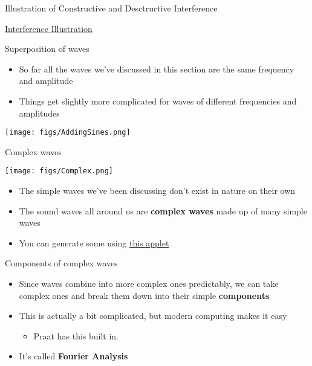 \documentclass[professionalfonts]{beamer}
\begin{document}
\begin{frame}{Illustration of Constructive and Desctructive Interference}
    \begin{center}
        \href{https://www.acs.psu.edu/drussell/Demos/superposition/interference.gif}{Interference Illustration}
    \end{center}
\end{frame}

\begin{frame}{Superposition of waves}
    \begin{multicols}{2}
        \begin{itemize}
            \item So far all the waves we’ve discussed in this section are the same frequency and amplitude
            \item Things get slightly more complicated for waves of different frequencies and amplitudes
        \end{itemize}
        \columnbreak
        \texttt{[image: figs/AddingSines.png]}
    \end{multicols}
\end{frame}

\begin{frame}{Complex waves}
    \begin{multicols}{2}
        \texttt{[image: figs/Complex.png]}

        \columnbreak

        \begin{itemize}
            \item The simple waves we’ve been discussing don’t exist in nature on their own
            \item The sound waves all around us are \textbf{complex waves} made up of many simple waves
            \item You can generate some using \href{https://www.falstad.com/fourier/}{this applet}
        \end{itemize}
    \end{multicols}
\end{frame}

\begin{frame}{Components of complex waves}
    \begin{itemize}
        \item Since waves combine into more complex ones predictably, we can take complex ones and break them down into their simple \textbf{components}
        \item This is actually a bit complicated, but modern computing makes it easy
        \begin{itemize}
            \item Praat has this built in.
        \end{itemize}
        \item It’s called \textbf{Fourier Analysis}
    \end{itemize}
\end{frame}
\end{document}
